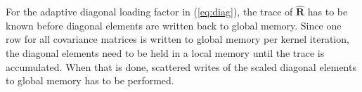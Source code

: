 \documentclass[journal]{IEEEtran}
\newcommand{\mat}[1]{\mathbf{#1}}
\begin{document}
For the adaptive diagonal loading factor in (\ref{eq:diag}), the trace of $\mat{\hat{R}}$ has to be known before diagonal elements are written back to global memory. Since one row for all covariance matrices is written to global memory per kernel iteration, the diagonal elements need to be held in a local memory until the trace is accumulated. When that is done, scattered writes of the scaled diagonal elements to global memory has to be performed. 





\end{document}
